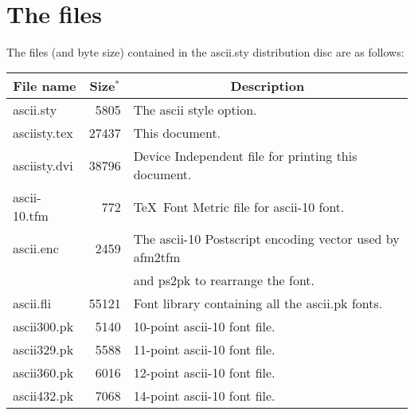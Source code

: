 \date{\vspace{1.5cm} July 10$^{th}$ 1993}
\maketitle

\newpage
{\ }
\vspace*{4cm}
\section{The files}

The files (and byte size) contained in the {\sc ascii.sty} distribution disc are as follows:

\begin{table}[h]
\begin{center}
\begin{tabular}{|l|r|l|}
\hline
\multicolumn{1}{|c|}{File name} & \multicolumn{1}{|c|}{Size$^{\ast}$}
& \multicolumn{1}{|c|}{Description}\\
\hline
\sc ascii.sty    & 5805   & The {\sc ascii} style option. \\

\sc asciisty.tex & 27437  & This document. \\

\sc asciisty.dvi & 38796  & Device Independent file for printing this document. \\

\sc ascii-10.tfm & 772    & \TeX\ Font Metric file for {\sc ascii-10} font. \\

\sc ascii.enc    & 2459   & The {\sc ascii-10} Postscript encoding vector used by {\sc afm2tfm} \\
                 &        & and {\sc ps2pk} to rearrange the font. \\

\sc ascii.fli    & 55121   & Font library containing all the {\sc ascii.pk} fonts.\\

\sc ascii300.pk  & 5140   & 10-point {\sc ascii-10} font file. \\

\sc ascii329.pk  & 5588   & 11-point {\sc ascii-10} font file. \\

\sc ascii360.pk  & 6016   & 12-point {\sc ascii-10} font file. \\

\sc ascii432.pk  & 7068   & 14-point {\sc ascii-10} font file. \\


\end{tabular}
\end{center}
\end{table}
